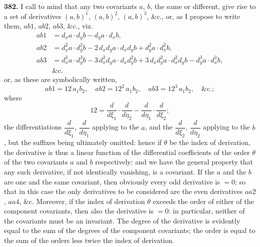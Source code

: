 \documentclass[11pt]{article}
\begin{document}
\noindent\textbf{382.} I call to mind that any two covariants $a$, $b$, the same or different, give rise to a set of derivatives $(a, b)^{1}$, $(a, b)^{2}$, $(a, b)^{3}$, \&c., or, as I propose to write them, $ab1$, $ab2$, $ab3$, \&c., viz.
\begin{align*}
ab1 &= d_{x}a\cdot d_{y}b - d_{y}a\cdot d_{x}b, \\
ab2 &= d_{x}^{2}a\cdot d_{y}^{2}b - 2\,d_{x}d_{y}a\cdot d_{x}d_{y}b + d_{y}^{2}a\cdot d_{x}^{2}b, \\
ab3 &= d_{x}^{3}a\cdot d_{y}^{3}b - 3\,d_{x}^{2}d_{y}a\cdot d_{x}d_{y}^{2}b + 3\,d_{x}d_{y}^{2}a\cdot d_{x}^{2}d_{y}b - d_{y}^{3}a\cdot d_{x}^{3}b, \\
&\&\text{c.}
\end{align*}
or, as these are symbolically written,
\[
ab1=12\,a_{1}b_{2},\quad ab2=12^{2}\,a_{1}b_{2},\quad ab3=12^{3}\,a_{1}b_{2},\quad \&\text{c.};
\]
where
\[
12=\frac{d}{d\xi_{1}}\cdot\frac{d}{d\eta_{2}}-\frac{d}{d\eta_{1}}\cdot\frac{d}{d\xi_{2}};
\]
the differentiations $\dfrac{d}{d\xi_{1}}$, $\dfrac{d}{d\eta_{1}}$ applying to the $a$, and the $\dfrac{d}{d\xi_{2}}$, $\dfrac{d}{d\eta_{2}}$ applying to the $b$, but the suffixes being ultimately omitted: hence if $\theta$ be the index of derivation, the derivative is thus a linear function of the differential coefficients of the order $\theta$ of the two covariants $a$ and $b$ respectively: and we have the general property that any such derivative, if not identically vanishing, is a covariant. If the $a$ and the $b$ are one and the same covariant, then obviously every odd derivative is $=0$; so that in this case the only derivatives to be considered are the even derivatives $aa2$, $aa4$, \&c. Moreover, if the index of derivation $\theta$ exceeds the order of either of the component covariants, then also the derivative is $=0$: in particular, neither of the covariants must be an invariant. The degree of the derivative is evidently equal to the sum of the degrees of the component covariants; the order is equal to the sum of the orders less twice the index of derivation.

\medskip
\end{document}
